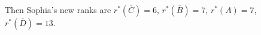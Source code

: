 Then Sophia's new ranks are $r^*(\overline{C})=6$, $r^*(\overline{B})=7$, $r^*(A)=7$, $r^*(\overline{D})=13$.

